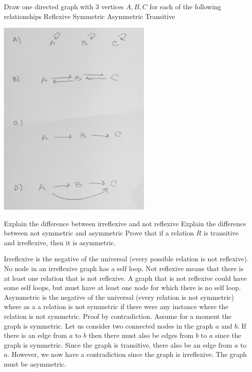 \documentclass[solution, letterpaper]{cs20inclass}
\begin{document}
\problem
Draw one directed graph with 3 vertices $A, B, C$ for each of the following relationships
\subproblem Reflexive
\subproblem Symmetric
\subproblem Asymmetric
\subproblem Transitive


\begin{solution}
\includegraphics[width=3in]{3NodeGraphs.jpg}



\end{solution}

\problem

\subproblem Explain the difference between irreflexive and not reflexive
\subproblem Explain the difference between not symmetric and asymmetric 
\subproblem Prove that if a relation $R$ is transitive and irreflexive, then it is asymmetric.

\begin{solution}
\subproblem Irreflexive is the negative of the universal (every possible relation is not reflexive). No node in an irreflexive graph has a self loop. Not reflexive means that there is at least one relation that is not reflexive. A graph that is not reflexive could have some self loops, but must have at least one node for which there is no self loop. 
\subproblem Asymmetric is the negative of the universal (every relation is not symmetric) where as a a relation is not symmetric if there were any instance where the relation is not symmetric. 
\subproblem Proof by contradiction. Assume for a moment the graph is symmetric. Let us consider two connected nodes in the graph $a$ and  $b$. If there is an edge from $a$ to $b$  then there must also be edges from $b$ to $a$ since the graph is symmetric. Since the graph is transitive, there also be an edge from $a$ to $a$. However, we now have a contradiction since the graph is irreflexive. The graph must be asymmetric. 


\end{solution}
\end{document}
